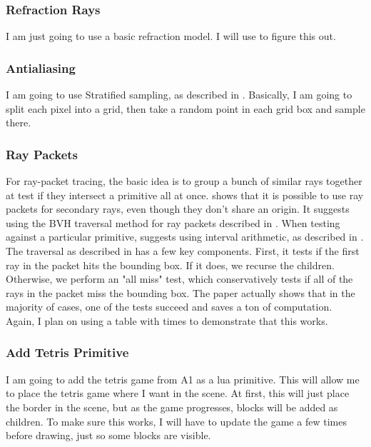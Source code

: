 \documentclass {article}
\begin{document}
\begin{description}
\subsubsection*{Refraction Rays}
    I am just going to use a basic refraction model. I will use \cite{PG10} to figure
    this out.

\subsubsection*{Antialiasing}
    I am going to use Stratified sampling, as described in \cite{PG10}. Basically, I am
    going to split each pixel into a grid, then take a random point in each grid box
    and sample there.

\subsubsection*{Ray Packets}
    For ray-packet tracing, the basic idea is to group a bunch of similar rays together
    at test if they intersect a primitive all at once. \cite{BEL07} shows that it is
    possible to use ray packets for secondary rays, even though they don't share
    an origin. It suggests using the BVH traversal method for ray packets described in
    \cite{WBS07}. When testing against a particular primitive, \cite{BEL07} suggests
    using interval arithmetic, as described in \cite{BWS06}. \\

    The traversal as described in \cite{WBS07} has a few key components. First, it
    tests if the first ray in the packet hits the bounding box. If it does, we recurse
    the children. Otherwise, we perform an "all miss" test, which conservatively tests
    if all of the rays in the packet miss the bounding box. The paper actually shows that
    in the majority of cases, one of the tests succeed and saves a ton of computation. \\

    Again, I plan on using a table with times to demonstrate that this works.

\subsubsection*{Add Tetris Primitive}
    I am going to add the tetris game from A1 as a lua primitive. This will allow me to place
    the tetris game where I want in the scene. At first, this will just place
    the border in the scene, but as the game progresses, blocks will be added as children.
    To make sure this works, I will have to update the game a few times before drawing,
    just so some blocks are visible.


\end{description}
\end{document}
